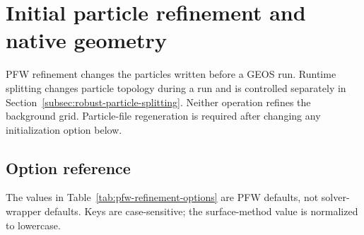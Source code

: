 \section{Initial particle refinement and native geometry}
\label{sec:pfw-refinement}

PFW refinement changes the particles written before a GEOS run. Runtime splitting changes particle topology during a run and is controlled separately in Section~\ref{subsec:robust-particle-splitting}. Neither operation refines the background grid. Particle-file regeneration is required after changing any initialization option below.

\subsection{Option reference}
The values in Table~\ref{tab:pfw-refinement-options} are PFW defaults, not solver-wrapper defaults. Keys are case-sensitive; the surface-method value is normalized to lowercase.
